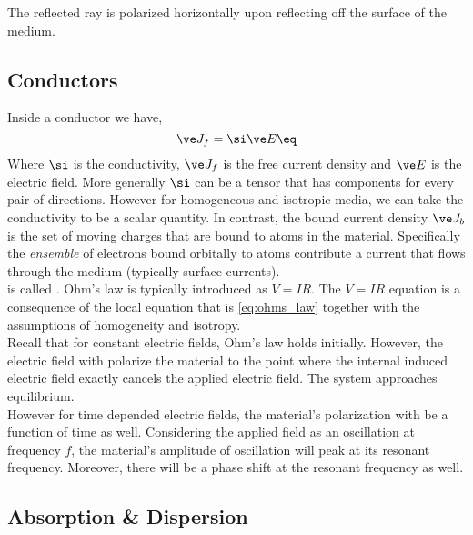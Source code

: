 \documentclass{article}
\begin{document}
The reflected ray is polarized horizontally upon reflecting off the surface of the medium.

\subsection{Conductors}

Inside a conductor we have,
\[ \ve J_f = \si \ve E \eq \label{eq:ohms_law}\]
Where $\si$ is the conductivity, $\ve J_f$ is the free current density and $\ve E$ is the electric field. More generally $\si$ can be a tensor that has components for every pair of directions. However for homogeneous and isotropic media, we can take the conductivity to be a scalar quantity. In contrast, the bound current density $\ve J_b$ is the set of moving charges that are bound to atoms in the material. Specifically the \textit{ensemble} of electrons bound orbitally to atoms contribute a current that flows through the medium (typically surface currents).\\

 is called . Ohm's law is typically introduced as $V = IR$. The $V = IR$ equation is a consequence of the local equation that is \cref{eq:ohms_law} together with the assumptions of homogeneity and isotropy. \\

Recall that for constant electric fields, Ohm's law holds initially. However, the electric field with polarize the material to the point where the internal induced electric field exactly cancels the applied electric field. The system approaches equilibrium. \\

However for time depended electric fields, the material's polarization with be a function of time as well. Considering the applied field as an oscillation at frequency $f$, the material's amplitude of oscillation will peak at its resonant frequency. Moreover, there will be a phase shift at the resonant frequency as well.

\subsection{Absorption \& Dispersion}
\end{document}
